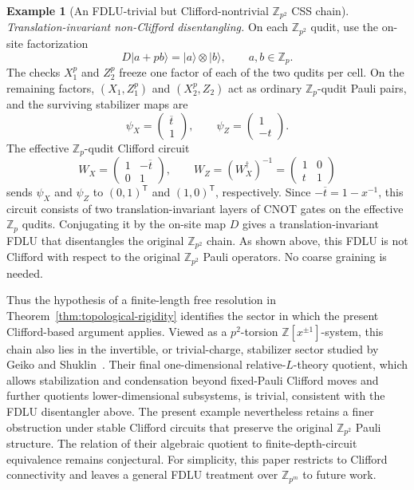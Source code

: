 \documentclass[aps,prx,english,superscriptaddress,twocolumn,tightenlines,showpacs,longbibliography,floatfix,amsfonts]{revtex4-2}
\theoremstyle{remark}
\theoremstyle{definition}
\newtheorem{example}{Example}
\begin{document}
\begin{example}[An FDLU-trivial but Clifford-nontrivial \(\mathbb Z_{p^2}\) CSS chain]
	\emph{Translation-invariant non-Clifford disentangling.}
	On each $\mathbb Z_{p^2}$ qudit, use the on-site factorization
	\begin{equation}
		D\lvert a+pb\rangle
		=
		\lvert a\rangle\otimes\lvert b\rangle,
		\qquad a,b\in\mathbb Z_p.
	\end{equation}
	The checks $X_1^p$ and $Z_2^p$ freeze one factor of each of the two
	qudits per cell. On the remaining factors,
	$(X_1,Z_1^p)$ and $(X_2^p,Z_2)$ act as ordinary
	$\mathbb Z_p$-qudit Pauli pairs, and the surviving stabilizer maps are
	\begin{equation}
		\psi_X=
		\begin{pmatrix}
			\overline{t}\\
			1
		\end{pmatrix},
		\qquad
		\psi_Z=
		\begin{pmatrix}
			1\\
			-t
		\end{pmatrix}.
	\end{equation}
	The effective $\mathbb Z_p$-qudit Clifford circuit
	\begin{equation}
		W_X=
		\begin{pmatrix}
			1 & -\overline{t}\\
			0 & 1
		\end{pmatrix},
		\qquad
		W_Z=(W_X^\dagger)^{-1}
		=
		\begin{pmatrix}
			1 & 0\\
			t & 1
		\end{pmatrix}
	\end{equation}
	sends $\psi_X$ and $\psi_Z$ to $(0,1)^\mathsf T$ and
	$(1,0)^\mathsf T$, respectively. Since
	$-\overline{t}=1-x^{-1}$, this circuit consists of two
	translation-invariant layers of CNOT gates on the effective
	$\mathbb Z_p$ qudits. Conjugating it by the on-site map $D$ gives a
	translation-invariant FDLU that disentangles the original
	$\mathbb Z_{p^2}$ chain. As shown above, this FDLU is not Clifford with
	respect to the original $\mathbb Z_{p^2}$ Pauli operators. No coarse
	graining is needed.
\end{example}

Thus the hypothesis of a finite-length free resolution in
Theorem~\ref{thm:topological-rigidity} identifies the sector in which the
present Clifford-based argument applies. Viewed as a $p^2$-torsion
$\mathbb Z[x^{\pm1}]$-system, this chain also lies in the invertible, or
trivial-charge, stabilizer sector studied by Geiko and
Shuklin~\cite{GeikoShuklin2025Invertible}. Their final one-dimensional
relative-$L$-theory quotient, which allows stabilization and condensation
beyond fixed-Pauli Clifford moves and further quotients lower-dimensional
subsystems, is trivial, consistent with the FDLU disentangler above. The
present example nevertheless retains a finer
obstruction under stable Clifford circuits that preserve the original
$\mathbb Z_{p^2}$ Pauli structure. The relation of their algebraic quotient
to finite-depth-circuit equivalence remains conjectural. For simplicity, this
paper restricts to Clifford connectivity and leaves a general FDLU treatment
over $\mathbb Z_{p^m}$ to future work.
\end{document}
